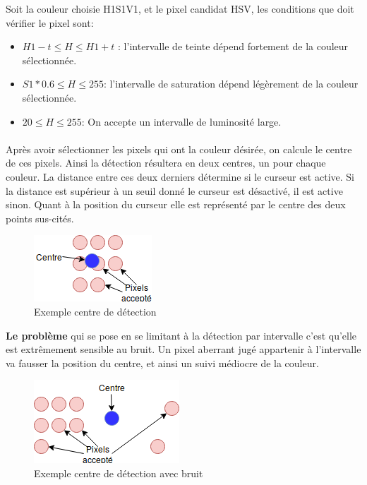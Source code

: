 \documentclass[12pt]{report}
\begin{document}
Soit la couleur choisie H1S1V1, et le pixel candidat HSV, les conditions que doit vérifier le pixel sont:
\begin{itemize}
	\item $H1-t \leq H \leq H1+t$ : l’intervalle de teinte dépend fortement de la couleur sélectionnée.
	
	\item $S1*0.6 \leq H \leq 255$: l’intervalle de saturation dépend légèrement de la couleur sélectionnée.
	
	\item $20 \leq H \leq 255$: On accepte un intervalle de luminosité large.
\end{itemize}
\paragraph{}Après avoir sélectionner les pixels qui ont la couleur désirée, on calcule le centre de ces pixels. Ainsi la détection résultera en deux centres, un pour chaque couleur. La distance entre ces deux derniers détermine si le curseur est active. Si la distance est supérieur à un seuil donné le curseur est désactivé, il est active sinon. Quant à la position du curseur elle est représenté par le centre des deux points sus-cités.\\
\begin{figure}[H]
	\centering
	\includegraphics[scale=0.75]{imgs/centerExample.png}
	\caption{Exemple centre de détection}
	\label{fig:CenterCorrect}
\end{figure}
\textbf{Le problème} qui se pose en se limitant à la détection par intervalle c’est qu’elle est extrêmement sensible au bruit. Un pixel aberrant jugé appartenir à l’intervalle va fausser la position du centre, et ainsi un suivi médiocre de la couleur.
\begin{figure}[H]
	\centering
	\includegraphics[scale=0.75]{imgs/centerExampleE.png}
	\caption{Exemple centre de détection avec bruit}
	\label{fig:CenterWrong}
\end{figure}
\end{document}
